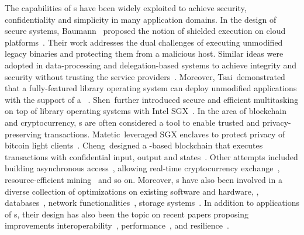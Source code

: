 
The capabilities of \tee{}s have been widely exploited to achieve security, confidentiality and 
simplicity in many application domains. In the design of secure systems, Baumann~\etal 
proposed the notion of shielded execution on cloud platforms~\cite{baumann2015shielding}. 
Their work addresses the dual challenges of executing unmodified legacy binaries 
and protecting them from a malicious host. Similar ideas were adopted in data-processing 
and delegation-based systems to achieve integrity and security without trusting the service 
providers~\cite{hunt2018ryoan,matetic2018delegatee,schneider2019secure}. 
Moreover, Tsai~\etal demonstrated that a 
fully-featured library operating system 
can deploy unmodified applications with the support of a \tee{}~\cite{tsai2017graphene}. 
Shen~\etal further introduced secure and efficient multitasking on top of library 
operating systems with Intel SGX~\cite{shen2020occlum}. 
In the area of blockchain and cryptocurrency, \tee{}s are often considered a tool to enable 
trusted and privacy-preserving transactions. Matetic~\etal leveraged SGX enclaves 
to protect privacy of bitcoin light clients~\cite{matetic2019bite}. Cheng~\etal designed 
a \tee{}-based blockchain that executes transactions with confidential input, 
output and states~\cite{cheng2019ekiden}. Other attempts included building asynchronous 
access~\cite{lind2019teechain}, allowing real-time cryptocurrency exchange~\cite{bentov2019tesseract}, 
resource-efficient mining~\cite{zhang2017rem} and so on. Moreover, \tee{}s have also been 
involved in a diverse collection of optimizations on existing software and hardware, 
\eg, databases~\cite{sun2021building,zhou2021veridb,eskandarian2017oblidb,priebe2018enclavedb}, 
network functionalities~\cite{herwig2020achieving,duan2019lightbox,poddar2018safebricks}, 
storage systems~\cite{bailleu2021avocado,bailleu2019speicher,krahn2018pesos,arasu2017concerto}. 
In addition to applications of \tee{}s, their design has also been the topic on recent papers proposing improvements
interoperability~\cite{feng2016scalable,weiser2019timber}, performance~\cite{li2021confidential}, and
resilience~\cite{bahmani2021cure,dessouky2020hybcache}.

